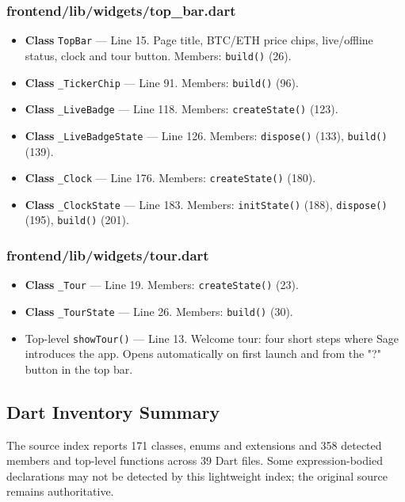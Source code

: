 \subsubsection*{frontend/lib/widgets/top\_bar.dart}
\begin{itemize}[nosep,leftmargin=1.5em]
\item \textbf{Class} \texttt{TopBar} --- Line 15. Page title, BTC/ETH price chips, live/offline status, clock and tour button. Members: \texttt{build(\allowbreak{})} (26).
\item \textbf{Class} \texttt{\_\allowbreak{}TickerChip} --- Line 91. Members: \texttt{build(\allowbreak{})} (96).
\item \textbf{Class} \texttt{\_\allowbreak{}LiveBadge} --- Line 118. Members: \texttt{createState(\allowbreak{})} (123).
\item \textbf{Class} \texttt{\_\allowbreak{}LiveBadgeState} --- Line 126. Members: \texttt{dispose(\allowbreak{})} (133), \texttt{build(\allowbreak{})} (139).
\item \textbf{Class} \texttt{\_\allowbreak{}Clock} --- Line 176. Members: \texttt{createState(\allowbreak{})} (180).
\item \textbf{Class} \texttt{\_\allowbreak{}ClockState} --- Line 183. Members: \texttt{initState(\allowbreak{})} (188), \texttt{dispose(\allowbreak{})} (195), \texttt{build(\allowbreak{})} (201).
\end{itemize}
\subsubsection*{frontend/lib/widgets/tour.dart}
\begin{itemize}[nosep,leftmargin=1.5em]
\item \textbf{Class} \texttt{\_\allowbreak{}Tour} --- Line 19. Members: \texttt{createState(\allowbreak{})} (23).
\item \textbf{Class} \texttt{\_\allowbreak{}TourState} --- Line 26. Members: \texttt{build(\allowbreak{})} (30).
\item Top-level \texttt{showTour(\allowbreak{})} --- Line 13. Welcome tour: four short steps where Sage introduces the app. Opens automatically on first launch and from the "?" button in the top bar.
\end{itemize}
\subsection{Dart Inventory Summary}
The source index reports 171 classes, enums and extensions and 358 detected members and top-level functions across 39 Dart files. Some expression-bodied declarations may not be detected by this lightweight index; the original source remains authoritative.
